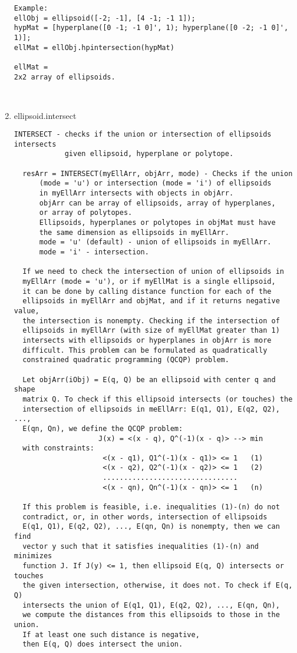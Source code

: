 \begin{enumerate}
\begin{lstlisting}
Example:
ellObj = ellipsoid([-2; -1], [4 -1; -1 1]);
hypMat = [hyperplane([0 -1; -1 0]', 1); hyperplane([0 -2; -1 0]', 1)];
ellMat = ellObj.hpintersection(hypMat)

ellMat =
2x2 array of ellipsoids.



\end{lstlisting}
\fontfamily{\familydefault}
\selectfont
\item {ellipsoid.intersect}
\selectfont
\begin{lstlisting}
INTERSECT - checks if the union or intersection of ellipsoids intersects
            given ellipsoid, hyperplane or polytope.

  resArr = INTERSECT(myEllArr, objArr, mode) - Checks if the union
      (mode = 'u') or intersection (mode = 'i') of ellipsoids
      in myEllArr intersects with objects in objArr.
      objArr can be array of ellipsoids, array of hyperplanes,
      or array of polytopes.
      Ellipsoids, hyperplanes or polytopes in objMat must have
      the same dimension as ellipsoids in myEllArr.
      mode = 'u' (default) - union of ellipsoids in myEllArr.
      mode = 'i' - intersection.

  If we need to check the intersection of union of ellipsoids in
  myEllArr (mode = 'u'), or if myEllMat is a single ellipsoid,
  it can be done by calling distance function for each of the
  ellipsoids in myEllArr and objMat, and if it returns negative value,
  the intersection is nonempty. Checking if the intersection of
  ellipsoids in myEllArr (with size of myEllMat greater than 1)
  intersects with ellipsoids or hyperplanes in objArr is more
  difficult. This problem can be formulated as quadratically
  constrained quadratic programming (QCQP) problem.

  Let objArr(iObj) = E(q, Q) be an ellipsoid with center q and shape
  matrix Q. To check if this ellipsoid intersects (or touches) the
  intersection of ellipsoids in meEllArr: E(q1, Q1), E(q2, Q2), ...,
  E(qn, Qn), we define the QCQP problem:
                    J(x) = <(x - q), Q^(-1)(x - q)> --> min
  with constraints:
                     <(x - q1), Q1^(-1)(x - q1)> <= 1   (1)
                     <(x - q2), Q2^(-1)(x - q2)> <= 1   (2)
                     ................................
                     <(x - qn), Qn^(-1)(x - qn)> <= 1   (n)

  If this problem is feasible, i.e. inequalities (1)-(n) do not
  contradict, or, in other words, intersection of ellipsoids
  E(q1, Q1), E(q2, Q2), ..., E(qn, Qn) is nonempty, then we can find
  vector y such that it satisfies inequalities (1)-(n) and minimizes
  function J. If J(y) <= 1, then ellipsoid E(q, Q) intersects or touches
  the given intersection, otherwise, it does not. To check if E(q, Q)
  intersects the union of E(q1, Q1), E(q2, Q2), ..., E(qn, Qn),
  we compute the distances from this ellipsoids to those in the union.
  If at least one such distance is negative,
  then E(q, Q) does intersect the union.


\end{lstlisting}
\end{enumerate}
